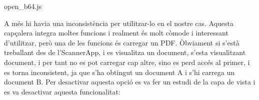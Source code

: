 \documentclass[letterpaper,11pt,catalan]{sphinxmanual}
\begin{document}
open\_b64.js

\begin{sphinxVerbatim}[commandchars=\\\{\}]
  
     
      
           
    \PYG{p}{[}\PYG{p}{]}  

        
  
   
\end{sphinxVerbatim}

A més hi havia una inconsistència per utilitzar-lo en el nostre cas. Aquesta capçalera
integra moltes funcions i realment és molt còmode i interessant d'utilitzar, però una
de les funcions és carregar un PDF. Òbviament si s'està treballant des de l'ScannerApp,
i es visualitza un document, s'esta visualitzant  document, i per tant no es pot
carregar cap altre, sino es perd accés al primer, i es torna inconsistent, ja que s'ha
obtingut un document A i s'hi carrega un document B. Per desactivar aquesta opció
es va fer un estudi de la capa de vista  i es va desactivar aquesta funcionalitat:
\end{document}
